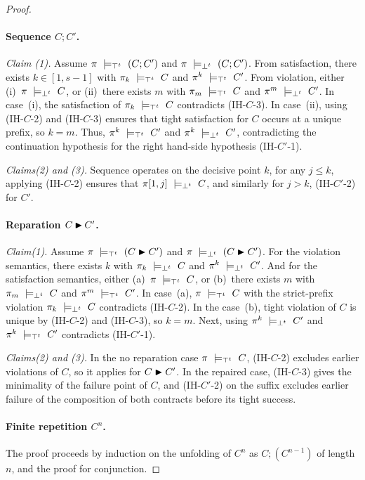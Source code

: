 \begin{proof}
\paragraph{Sequence $C\mathbin{;}C'$.}
\emph{Claim (1).}
Assume $\pi\ \satt\ (C;C')$ and $\pi\ \violt\ (C;C')$.
From satisfaction, there exists $k\in[1,s{-}1]$ with $\pi_k\ \models_{\top^t}\ C$ and $\pi^{k}\ \models_{\top^t}\ C'$.
From violation, either (i)~$\pi\ \models_{\bot^t}\ C$, or (ii)~there exists $m$ with $\pi_m\ \models_{\top^t}\ C$ and $\pi^{m}\ \models_{\bot^t}\ C'$.
In case~(i), the satisfaction of $\pi_k\ \models_{\top^t}\ C$ contradicts (IH-$C$-3).
In case~(ii),  using (IH-$C$-2) and (IH-$C$-3) ensures that tight satisfaction for $C$ occurs at a unique prefix, so $k = m$. Thus, $\pi^{k}\ \models_{\top^t}\ C'$ and $\pi^{k}\ \models_{\bot^t}\ C'$, contradicting the continuation hypothesis for the right hand-side hypothesis (IH-$C'$-1).

\emph{Claims(2) and (3).}
Sequence operates on the decisive point $k$, for any $j \le k$, applying (IH-$C$-2) ensures that $\pi[1,j]\ \models_{\bot^t}\ C$, and similarly for $j > k$, (IH-$C'$-2) for $C'$. 

\paragraph{Reparation $C\mathbin{\blacktriangleright} C'$.}
\emph{Claim(1).}
Assume $\pi\ \satt\ (C\repair C')$ and $\pi\ \violt\ (C\repair C')$.
For the violation semantics, there exists $k$ with $\pi_k\ \models_{\bot^t}\ C$ and $\pi^{k}\ \models_{\bot^t}\ C'$.
And for the satisfaction semantics, either (a)~$\pi\ \satt\ C$, or (b)~there exists $m$ with $\pi_m\ \models_{\bot^t}\ C$ and $\pi^{m}\ \models_{\top^t}\ C'$.
In case~(a), $\pi\ \satt\ C$ with the strict-prefix violation $\pi_k\ \models_{\bot^t}\ C$ contradicts (IH-$C$-2).
In the case~(b), tight violation of $C$ is unique by (IH-$C$-2) and (IH-$C$-3), so $k = m$.
Next, using $\pi^{k}\ \models_{\bot^t}\ C'$ and $\pi^{k}\ \models_{\top^t}\ C'$ contradicts (IH-$C'$-1).

\emph{Claims(2) and (3).}
In the no reparation case $\pi\ \satt\ C$, (IH-$C$-2) excludes earlier violations of $C$, so it applies for $C\blacktriangleright C'$.
In the repaired case, (IH-$C$-3) gives the minimality of the failure point of $C$, and (IH-$C'$-2) on the suffix excludes earlier failure of the composition of both contracts before its tight success.

\paragraph{Finite repetition $C^n$.}
The proof proceeds by induction on the unfolding of $ C^n$ as $C;(C^{n-1})$ of length $ n$, and the proof for conjunction.


\end{proof}
